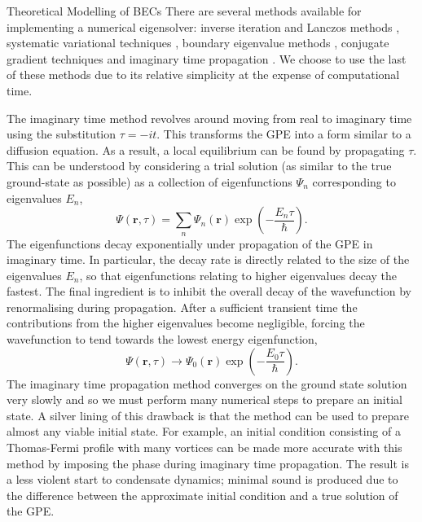 \begin{chapter}{\label{cha:theoretical_model}Theoretical Modelling of BECs}
	There are several methods available for implementing a numerical eigensolver: inverse iteration and Lanczos methods \cite{thijssen1999computational}, systematic variational techniques \cite{Bao2003230}, boundary eigenvalue methods \cite{Edwards95}, conjugate gradient techniques \cite{NumericalRecipes} and imaginary time propagation \cite{PhysRevE.62.7438}. We choose to use the last of these methods due to its relative simplicity at the expense of computational time.

	The imaginary time method revolves around moving from real to imaginary time using the substitution $\tau = -it$. This transforms the GPE into a form similar to a diffusion equation. As a result, a local equilibrium can be found by propagating $\tau$. This can be understood by considering a trial solution (as similar to the true ground-state as possible) as a collection of eigenfunctions $\Psi_n$ corresponding to eigenvalues $E_n$,
\begin{equation*}
\Psi(\mathbf{r},\tau) = \sum_n \Psi_n(\mathbf{r})\exp\left(-\frac{E_n\tau}{\hbar}\right).
\end{equation*}
The eigenfunctions decay exponentially under propagation of the GPE in imaginary time. In particular, the decay rate is directly related to the size of the eigenvalues $E_n$, so that eigenfunctions relating to higher eigenvalues decay the fastest. The final ingredient is to inhibit the overall decay of the wavefunction by renormalising during propagation. After a sufficient transient time the contributions from the higher eigenvalues become negligible, forcing the wavefunction to tend towards the lowest energy eigenfunction,
\begin{equation*}
\Psi(\mathbf{r},\tau) \rightarrow \Psi_0(\mathbf{r})\exp\left(-\frac{E_0\tau}{\hbar}\right).
\end{equation*}
The imaginary time propagation method converges on the ground state solution very slowly and so we must perform many numerical steps to prepare an initial state. A silver lining of this drawback is that the method can be used to prepare almost any viable initial state. For example, an initial condition consisting of a Thomas-Fermi profile with many vortices can be made more accurate with this method by imposing the phase during imaginary time propagation. The result is a less violent start to condensate dynamics; minimal sound is produced due to the difference between the approximate initial condition and a true solution of the GPE.


\end{chapter}
